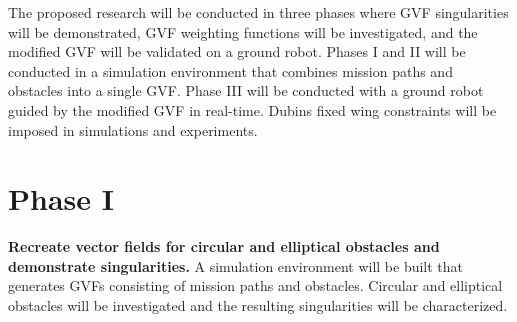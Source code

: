 \documentclass[numbered,pdftex]{ohio-etd}
\begin{document}


The proposed research will be conducted in three phases where GVF singularities will be demonstrated, GVF weighting functions will be investigated, and the modified GVF will be validated on a ground robot. Phases I and II will be conducted in a simulation environment that combines mission paths and obstacles into a single GVF. Phase III will be conducted with a ground robot guided by the modified GVF in real-time. Dubins fixed wing constraints will be imposed in simulations and experiments. 


\section{Phase I}
\textbf{Recreate vector fields for circular and elliptical obstacles and demonstrate singularities.} A simulation environment will be built that generates GVFs consisting of mission paths and obstacles. Circular and elliptical obstacles will be investigated and the resulting singularities will be characterized. 
\end{document}
